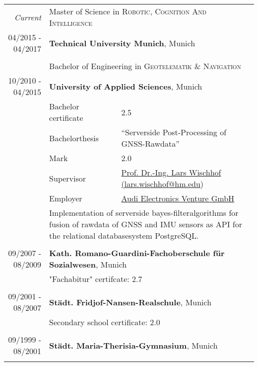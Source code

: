 \documentclass[a4paper,10pt]{article} %
\begin{document}
\begin{tabular}{r|l@{: }p{11cm}}
\emph{Current} & \multicolumn{2}{p{11cm}}{Master of Science in \textsc{Robotic, Cognition And Intelligence}}\\
\textsc{04/2015 - 04/2017} & \multicolumn{2}{p{11cm}}{\textbf{Technical University Munich}, Munich} \\
\multicolumn{3}{c}{}\\
& \multicolumn{2}{p{11cm}}{Bachelor of Engineering in \textsc{Geotelematik \& Navigation}}\\
\textsc{10/2010 - 04/2015} & \multicolumn{2}{p{11cm}}{\textbf{University of Applied Sciences}, Munich} \\
                           $$& \small Bachelor certificate & \small 2.5\\
                           & \small Bachelorthesis & \small ``Serverside Post-Processing of GNSS-Rawdata'' \\
                           & \small Mark           & \small 2.0\\
                           & \small Supervisor     & \small \href{mailto:lars.wischhof@hm.edu}{Prof. Dr.-Ing. Lars Wischhof (lars.wischhof@hm.edu})\\
                           & \small Employer       & \small \href{http://www.audi-electronics-venture.de}{Audi Electronics Venture GmbH} \\
                           & \multicolumn{2}{p{11cm}}{\small Implementation of serverside bayes-filteralgorithms for fusion of rawdata of GNSS and IMU sensors as API for the relational databasesystem PostgreSQL.}\\
\multicolumn{3}{c}{}\\
 
 
\textsc{09/2007 - 08/2009} & \multicolumn{2}{p{11cm}}{\textbf{Kath. Romano-Guardini-Fachoberschule für Sozialwesen}, Munich} \\
                           & \multicolumn{2}{p{11cm}}{\small "Fachabitur" certifcate: 2.7}                                         \\
\multicolumn{3}{c}{}                                                                                \\
 
 
\textsc{09/2001 - 08/2007} & \multicolumn{2}{p{11cm}}{\textbf{Städt. Fridjof-Nansen-Realschule}, Munich} \\
                           & \multicolumn{2}{p{11cm}}{\small Secondary school certificate: 2.0} \\
\multicolumn{3}{c}{}\\
 
 
\textsc{09/1999 - 08/2001} & \multicolumn{2}{p{11cm}}{\textbf{Städt. Maria-Therisia-Gymnasium}, Munich} \\
\multicolumn{3}{c}{}\\
\end{tabular}
 
\end{document}
